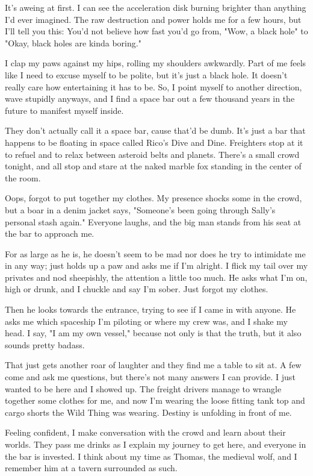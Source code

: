 It's aweing at first. I can see the acceleration disk burning brighter than anything I'd ever imagined. The raw destruction and power holds me for a few hours, but I'll tell you this: You'd not believe how fast you'd go from, "Wow, a black hole" to "Okay, black holes are kinda boring."

I clap my paws against my hips, rolling my shoulders awkwardly. Part of me feels like I need to excuse myself to be polite, but it's just a black hole. It doesn't really care how entertaining it has to be. So, I point myself to another direction, wave stupidly anyways, and I find a space bar out a few thousand years in the future to manifest myself inside.

They don't actually call it a space bar, cause that'd be dumb. It's just a bar that happens to be floating in space called Rico's Dive and Dine. Freighters stop at it to refuel and to relax between asteroid belts and planets. There's a small crowd tonight, and all stop and stare at the naked marble fox standing in the center of the room.

Oops, forgot to put together my clothes. My presence shocks some in the crowd, but a boar in a denim jacket says, "Someone's been going through Sally's personal stash again." Everyone laughs, and the big man stands from his seat at the bar to approach me.

For as large as he is, he doesn't seem to be mad nor does he try to intimidate me in any way; just holds up a paw and asks me if I'm alright. I flick my tail over my privates and nod sheepishly, the attention a little too much. He asks what I'm on, high or drunk, and I chuckle and say I'm sober. Just forgot my clothes.

Then he looks towards the entrance, trying to see if I came in with anyone. He asks me which spaceship I'm piloting or where my crew was, and I shake my head. I say, "I am my own vessel," because not only is that the truth, but it also sounds pretty badass.

That just gets another roar of laughter and they find me a table to sit at. A few come and ask me questions, but there's not many answers I can provide. I just wanted to be here and I showed up. The freight drivers manage to wrangle together some clothes for me, and now I'm wearing the loose fitting tank top and cargo shorts the Wild Thing was wearing. Destiny is unfolding in front of me.

Feeling confident, I make conversation with the crowd and learn about their worlds. They pass me drinks as I explain my journey to get here, and everyone in the bar is invested. I think about my time as Thomas, the medieval wolf, and I remember him at a tavern surrounded as such.

